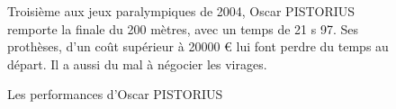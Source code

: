 \begin{figure}
	\caption{Les performances d'Oscar PISTORIUS}
	\label{doc:perfs}
	
	
	\begin{shaded*}
			Troisième aux jeux paralympiques de 2004, Oscar PISTORIUS remporte la finale du 200 mètres, avec un temps de 21 s 97. Ses prothèses, d'un coût supérieur à \num{20000} € lui font perdre du temps au départ. Il a aussi du mal à négocier les virages.
	\end{shaded*}
\end{figure} 